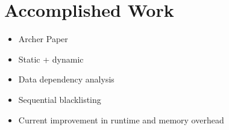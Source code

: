 \section{Accomplished Work}
\label{sec:accomplishedwork}

\begin{itemize}
\item Archer Paper
\item Static + dynamic
\item Data dependency analysis
\item Sequential blacklisting
\item Current improvement in runtime and memory overhead
\end{itemize}

